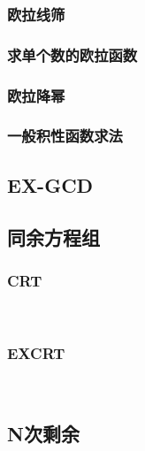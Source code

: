 \documentclass[twocolumn,a4]{article}
\newcommand{\addcpp}[1]{}
\begin{document}
		\subsubsection{欧拉线筛}
		\subsubsection{求单个数的欧拉函数}
		\subsubsection{欧拉降幂}
			\addcpp{math/EXEuler}
		\subsubsection{一般积性函数求法}
	\subsection{EX-GCD}
	\subsection{同余方程组}
		\subsubsection{CRT}
​			%
​		\subsubsection{EXCRT}
​			\addcpp{math/EXCRT}
​	\subsection{N次剩余}
\end{document}
